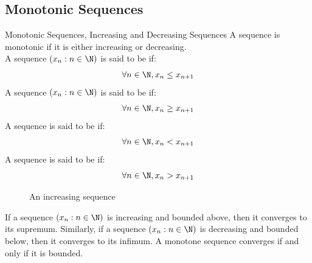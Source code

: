\documentclass[openany]{book}
\begin{document}
\subsection{Monotonic Sequences}
\begin{mydefinition}{Monotonic Sequences, Increasing and Decreasing Sequences}
    A sequence is monotonic if it is either increasing or decreasing. \\
    A sequence $(x_n : n \in \N)$ is said to be  if:
    $$\forall n \in \N, x_n \leq x_{n+1}$$
    A sequence $(x_n : n \in \N)$ is said to be  if:
    $$\forall n \in \N, x_n \geq x_{n+1}$$
    A sequence is said to be  if:
    $$\forall n \in \N, x_n < x_{n+1}$$
    A sequence is said to be  if:
    $$\forall n \in \N, x_n > x_{n+1}$$ 
\end{mydefinition}
\begin{figure}[H]
    \centering
    \caption{An increasing sequence}
    \label{fig:increasing_sequence}
\end{figure}
\begin{mytheorem}
    If a sequence $(x_n : n \in \N)$ is increasing and bounded above, then it converges to its supremum. Similarly, if a sequence $(x_n : n \in \N)$ is decreasing and bounded below, then it converges to its infimum. A monotone sequence converges if and only if it is bounded.
\end{mytheorem}
\end{document}
